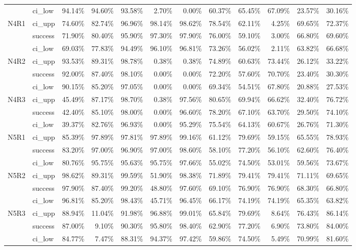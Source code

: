\begin{tabular}{llrrrrrrrrrr}
     & ci\_low &      94.14\% & 94.60\% & 93.58\% &  2.70\% &  0.00\% &       60.37\% & 65.45\% & 67.09\% & 23.57\% & 30.16\% \\
N4R1 & ci\_upp &      74.60\% & 82.74\% & 96.96\% & 98.14\% & 98.62\% &       78.54\% & 62.11\% &  4.25\% & 69.65\% & 72.37\% \\
     & success &      71.90\% & 80.40\% & 95.90\% & 97.30\% & 97.90\% &       76.00\% & 59.10\% &  3.00\% & 66.80\% & 69.60\% \\
     & ci\_low &      69.03\% & 77.83\% & 94.49\% & 96.10\% & 96.81\% &       73.26\% & 56.02\% &  2.11\% & 63.82\% & 66.68\% \\
N4R2 & ci\_upp &      93.53\% & 89.31\% & 98.78\% &  0.38\% &  0.38\% &       74.89\% & 60.63\% & 73.44\% & 26.12\% & 33.22\% \\
     & success &      92.00\% & 87.40\% & 98.10\% &  0.00\% &  0.00\% &       72.20\% & 57.60\% & 70.70\% & 23.40\% & 30.30\% \\
     & ci\_low &      90.15\% & 85.20\% & 97.05\% &  0.00\% &  0.00\% &       69.34\% & 54.51\% & 67.80\% & 20.88\% & 27.53\% \\
N4R3 & ci\_upp &      45.49\% & 87.17\% & 98.70\% &  0.38\% & 97.56\% &       80.65\% & 69.94\% & 66.62\% & 32.40\% & 76.72\% \\
     & success &      42.40\% & 85.10\% & 98.00\% &  0.00\% & 96.60\% &       78.20\% & 67.10\% & 63.70\% & 29.50\% & 74.10\% \\
     & ci\_low &      39.37\% & 82.76\% & 96.93\% &  0.00\% & 95.29\% &       75.54\% & 64.13\% & 60.67\% & 26.76\% & 71.30\% \\
N5R1 & ci\_upp &      85.39\% & 97.89\% & 97.81\% & 97.89\% & 99.16\% &       61.12\% & 79.69\% & 59.15\% & 65.55\% & 78.93\% \\
     & success &      83.20\% & 97.00\% & 96.90\% & 97.00\% & 98.60\% &       58.10\% & 77.20\% & 56.10\% & 62.60\% & 76.40\% \\
     & ci\_low &      80.76\% & 95.75\% & 95.63\% & 95.75\% & 97.66\% &       55.02\% & 74.50\% & 53.01\% & 59.56\% & 73.67\% \\
N5R2 & ci\_upp &      98.62\% & 89.31\% & 99.59\% & 51.90\% & 98.38\% &       71.89\% & 79.41\% & 79.41\% & 71.11\% & 69.65\% \\
     & success &      97.90\% & 87.40\% & 99.20\% & 48.80\% & 97.60\% &       69.10\% & 76.90\% & 76.90\% & 68.30\% & 66.80\% \\
     & ci\_low &      96.81\% & 85.20\% & 98.43\% & 45.71\% & 96.45\% &       66.17\% & 74.19\% & 74.19\% & 65.35\% & 63.82\% \\
N5R3 & ci\_upp &      88.94\% & 11.04\% & 91.98\% & 96.88\% & 99.01\% &       65.84\% & 79.69\% &  8.64\% & 76.43\% & 86.14\% \\
     & success &      87.00\% &  9.10\% & 90.30\% & 95.80\% & 98.40\% &       62.90\% & 77.20\% &  6.90\% & 73.80\% & 84.00\% \\
     & ci\_low &      84.77\% &  7.47\% & 88.31\% & 94.37\% & 97.42\% &       59.86\% & 74.50\% &  5.49\% & 70.99\% & 81.60\% \\
\bottomrule
\end{tabular}

